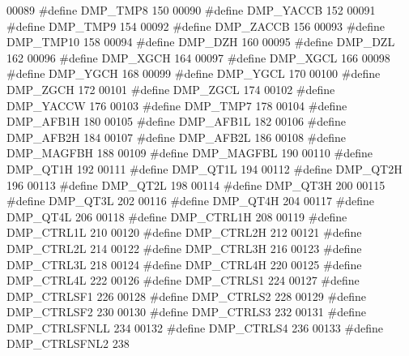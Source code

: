 \begin{DoxyCode}
00089 \textcolor{preprocessor}{#define DMP\_TMP8    150}
00090 \textcolor{preprocessor}{#define DMP\_YACCB    152}
00091 \textcolor{preprocessor}{#define DMP\_TMP9    154}
00092 \textcolor{preprocessor}{#define DMP\_ZACCB    156}
00093 \textcolor{preprocessor}{#define DMP\_TMP10    158}
00094 \textcolor{preprocessor}{#define DMP\_DZH    160}
00095 \textcolor{preprocessor}{#define DMP\_DZL    162}
00096 \textcolor{preprocessor}{#define DMP\_XGCH    164}
00097 \textcolor{preprocessor}{#define DMP\_XGCL    166}
00098 \textcolor{preprocessor}{#define DMP\_YGCH    168}
00099 \textcolor{preprocessor}{#define DMP\_YGCL    170}
00100 \textcolor{preprocessor}{#define DMP\_ZGCH    172}
00101 \textcolor{preprocessor}{#define DMP\_ZGCL    174}
00102 \textcolor{preprocessor}{#define DMP\_YACCW    176}
00103 \textcolor{preprocessor}{#define DMP\_TMP7    178}
00104 \textcolor{preprocessor}{#define DMP\_AFB1H    180}
00105 \textcolor{preprocessor}{#define DMP\_AFB1L    182}
00106 \textcolor{preprocessor}{#define DMP\_AFB2H    184}
00107 \textcolor{preprocessor}{#define DMP\_AFB2L    186}
00108 \textcolor{preprocessor}{#define DMP\_MAGFBH    188}
00109 \textcolor{preprocessor}{#define DMP\_MAGFBL    190}
00110 \textcolor{preprocessor}{#define DMP\_QT1H    192}
00111 \textcolor{preprocessor}{#define DMP\_QT1L    194}
00112 \textcolor{preprocessor}{#define DMP\_QT2H    196}
00113 \textcolor{preprocessor}{#define DMP\_QT2L    198}
00114 \textcolor{preprocessor}{#define DMP\_QT3H    200}
00115 \textcolor{preprocessor}{#define DMP\_QT3L    202}
00116 \textcolor{preprocessor}{#define DMP\_QT4H    204}
00117 \textcolor{preprocessor}{#define DMP\_QT4L    206}
00118 \textcolor{preprocessor}{#define DMP\_CTRL1H    208}
00119 \textcolor{preprocessor}{#define DMP\_CTRL1L    210}
00120 \textcolor{preprocessor}{#define DMP\_CTRL2H    212}
00121 \textcolor{preprocessor}{#define DMP\_CTRL2L    214}
00122 \textcolor{preprocessor}{#define DMP\_CTRL3H    216}
00123 \textcolor{preprocessor}{#define DMP\_CTRL3L    218}
00124 \textcolor{preprocessor}{#define DMP\_CTRL4H    220}
00125 \textcolor{preprocessor}{#define DMP\_CTRL4L    222}
00126 \textcolor{preprocessor}{#define DMP\_CTRLS1    224}
00127 \textcolor{preprocessor}{#define DMP\_CTRLSF1    226}
00128 \textcolor{preprocessor}{#define DMP\_CTRLS2    228}
00129 \textcolor{preprocessor}{#define DMP\_CTRLSF2    230}
00130 \textcolor{preprocessor}{#define DMP\_CTRLS3    232}
00131 \textcolor{preprocessor}{#define DMP\_CTRLSFNLL    234}
00132 \textcolor{preprocessor}{#define DMP\_CTRLS4    236}
00133 \textcolor{preprocessor}{#define DMP\_CTRLSFNL2    238}

\end{DoxyCode}
